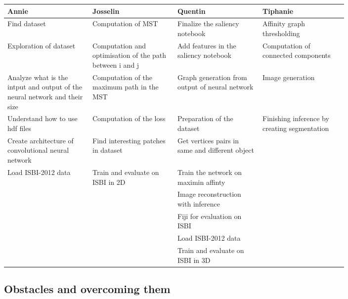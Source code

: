 \begin{center}
	\begin{tabular}{ |p{0.2\linewidth}|p{0.2\linewidth}|p{0.2\linewidth}|p{0.2\linewidth}| } 
 \hline
 Annie & Josselin & Quentin & Tiphanie \\
 \hline
 Find dataset & Computation of MST & Finalize the saliency notebook & Affinity graph thresholding \\ 
 \hline
 Exploration of dataset & Computation and optimisation of the path between i and j & Add features in the saliency notebook & Computation of connected components \\ 
 \hline
 Analyze what is the intput and output of the neural network and their size & Computation of the maximum path in the MST & Graph generation from output of neural network & Image generation \\ 
 \hline
 Understand how to use hdf files & Computation of the loss & Preparation of the dataset & Finishing inference by creating segmentation \\
 \hline
 Create architecture of convolutional neural network & Find interesting patches in dataset & Get vertices pairs in same and different object & \\
 \hline
 Load ISBI-2012 data & Train and evaluate on ISBI in 2D & Train the network on maximin affinty & \\
 \hline
  & & Image reconstruction with inference & \\
 \hline
  & & Fiji for evaluation on ISBI & \\
 \hline
  & & Load ISBI-2012 data & \\
 \hline
 & & Train and evaluate on ISBI in 3D & \\

 \hline
\end{tabular}
\end{center}


\subsection{Obstacles and overcoming them}

